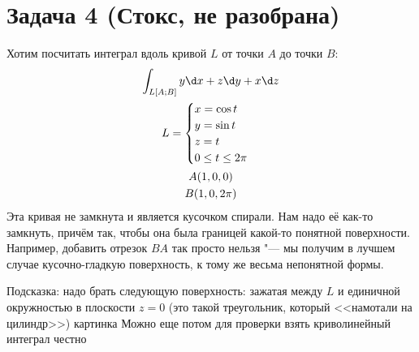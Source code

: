 \section{Задача 4 (Стокс, не разобрана)}
	Хотим посчитать интеграл вдоль кривой $L$ от точки $A$ до точки $B$:
	\begin{gather*}
		\int_{L[A;B]} y \d x + z \d y + x \d z \\
		L = \begin{cases}
			x = \cos t \\
			y = \sin t \\
			z = t \\
			0 \le t \le 2 \pi
		\end{cases} \\
		A(1, 0, 0) \\
		B(1, 0, 2\pi)
	\end{gather*}
	Эта кривая не замкнута и является кусочком спирали.
	Нам надо её как-то замкнуть, причём так, чтобы она была границей какой-то понятной поверхности.
	Например, добавить отрезок $BA$ так просто нельзя "--- мы получим в лучшем случае кусочно-гладкую поверхность,
	к тому же весьма непонятной формы.

	Подсказка: надо брать следующую поверхность: зажатая между $L$ и единичной окружностью в плоскости
	$z=0$ (это такой треугольник, который <<намотали на цилиндр>>)
	\TODO картинка
	Можно еще потом для проверки взять криволинейный интеграл честно
